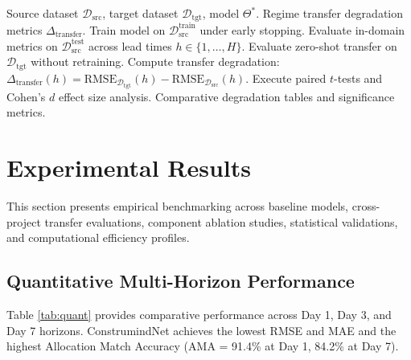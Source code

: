 \documentclass[11pt,a4paper]{article}
\begin{document}
\begin{algorithm}[h]
\caption{Formalized Cross-Project Regime Transfer Protocol}\label{alg:eval}
\begin{algorithmic}[1]
\Require Source dataset $\mathcal{D}_{\text{src}}$, target dataset $\mathcal{D}_{\text{tgt}}$, model $\Theta^*$.
\Ensure Regime transfer degradation metrics $\Delta_{\text{transfer}}$.
\State Train model on $\mathcal{D}_{\text{src}}^{\text{train}}$ under early stopping.
\State Evaluate in-domain metrics on $\mathcal{D}_{\text{src}}^{\text{test}}$ across lead times $h \in \{1, \dots, H\}$.
\State Evaluate zero-shot transfer on $\mathcal{D}_{\text{tgt}}$ without retraining.
\State Compute transfer degradation: $\Delta_{\text{transfer}}(h) = \text{RMSE}_{\mathcal{D}_{\text{tgt}}}(h) - \text{RMSE}_{\mathcal{D}_{\text{src}}}(h)$.
\State Execute paired $t$-tests and Cohen's $d$ effect size analysis.
\State \Return Comparative degradation tables and significance metrics.
\end{algorithmic}
\end{algorithm}

\section{Experimental Results}\label{sec:results}
This section presents empirical benchmarking across baseline models, cross-project transfer evaluations, component ablation studies, statistical validations, and computational efficiency profiles.

\subsection{Quantitative Multi-Horizon Performance}
Table \ref{tab:quant} provides comparative performance across Day 1, Day 3, and Day 7 horizons. ConstrumindNet achieves the lowest RMSE and MAE and the highest Allocation Match Accuracy (AMA = 91.4\% at Day 1, 84.2\% at Day 7).
\end{document}
